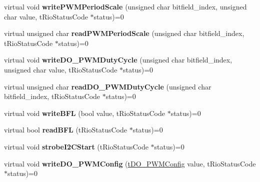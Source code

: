 \begin{DoxyCompactItemize}
\item 
\hypertarget{classnFPGA_1_1nFRC__2012__1__6__4_1_1tDIO_a20416289c863356668bc8e6041e6b34f}{
virtual void {\bfseries writePWMPeriodScale} (unsigned char bitfield\_\-index, unsigned char value, tRioStatusCode $\ast$status)=0}
\label{classnFPGA_1_1nFRC__2012__1__6__4_1_1tDIO_a20416289c863356668bc8e6041e6b34f}

\item 
\hypertarget{classnFPGA_1_1nFRC__2012__1__6__4_1_1tDIO_ad9265b7af2dc462ce9aa66b9dd4fd0d8}{
virtual unsigned char {\bfseries readPWMPeriodScale} (unsigned char bitfield\_\-index, tRioStatusCode $\ast$status)=0}
\label{classnFPGA_1_1nFRC__2012__1__6__4_1_1tDIO_ad9265b7af2dc462ce9aa66b9dd4fd0d8}

\item 
\hypertarget{classnFPGA_1_1nFRC__2012__1__6__4_1_1tDIO_a88c59806246d69f07044d3a891ecff1c}{
virtual void {\bfseries writeDO\_\-PWMDutyCycle} (unsigned char bitfield\_\-index, unsigned char value, tRioStatusCode $\ast$status)=0}
\label{classnFPGA_1_1nFRC__2012__1__6__4_1_1tDIO_a88c59806246d69f07044d3a891ecff1c}

\item 
\hypertarget{classnFPGA_1_1nFRC__2012__1__6__4_1_1tDIO_a4824e8301da55ca83799e116bef955bf}{
virtual unsigned char {\bfseries readDO\_\-PWMDutyCycle} (unsigned char bitfield\_\-index, tRioStatusCode $\ast$status)=0}
\label{classnFPGA_1_1nFRC__2012__1__6__4_1_1tDIO_a4824e8301da55ca83799e116bef955bf}

\item 
\hypertarget{classnFPGA_1_1nFRC__2012__1__6__4_1_1tDIO_a914f92d130e8381a3d2955e9c860a939}{
virtual void {\bfseries writeBFL} (bool value, tRioStatusCode $\ast$status)=0}
\label{classnFPGA_1_1nFRC__2012__1__6__4_1_1tDIO_a914f92d130e8381a3d2955e9c860a939}

\item 
\hypertarget{classnFPGA_1_1nFRC__2012__1__6__4_1_1tDIO_a9ce43ede928305ca8a3fa814bc1a2d24}{
virtual bool {\bfseries readBFL} (tRioStatusCode $\ast$status)=0}
\label{classnFPGA_1_1nFRC__2012__1__6__4_1_1tDIO_a9ce43ede928305ca8a3fa814bc1a2d24}

\item 
\hypertarget{classnFPGA_1_1nFRC__2012__1__6__4_1_1tDIO_abda5b9275b495f4bd4de946a1ef58d00}{
virtual void {\bfseries strobeI2CStart} (tRioStatusCode $\ast$status)=0}
\label{classnFPGA_1_1nFRC__2012__1__6__4_1_1tDIO_abda5b9275b495f4bd4de946a1ef58d00}

\item 
\hypertarget{classnFPGA_1_1nFRC__2012__1__6__4_1_1tDIO_a0633408ae4bc3a4234e060d203d7401f}{
virtual void {\bfseries writeDO\_\-PWMConfig} (\hyperlink{unionnFPGA_1_1nFRC__2012__1__6__4_1_1tDIO_1_1tDO__PWMConfig}{tDO\_\-PWMConfig} value, tRioStatusCode $\ast$status)=0}
\label{classnFPGA_1_1nFRC__2012__1__6__4_1_1tDIO_a0633408ae4bc3a4234e060d203d7401f}


\end{DoxyCompactItemize}
